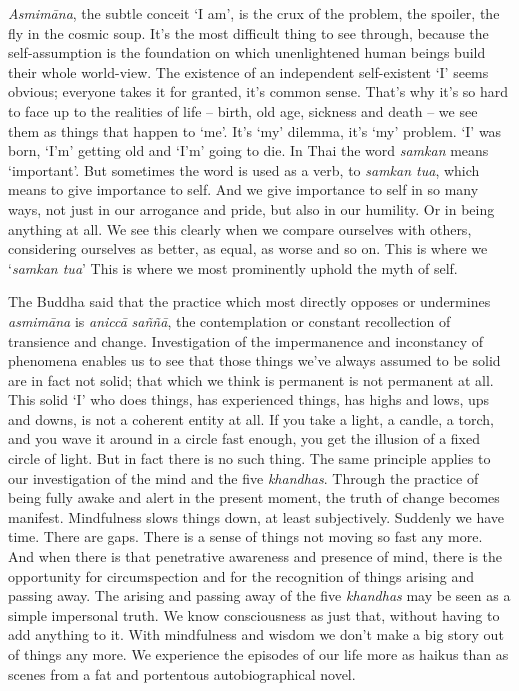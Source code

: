 \emph{Asmimāna}, the subtle conceit `I am', is the crux of the problem, 
the spoiler, the fly in the cosmic soup. It's the most difficult thing
to see through, because the self-assumption is the foundation on which
unenlightened human beings build their whole world-view. The existence
of an independent self-existent `I' seems obvious; everyone takes it for
granted, it's common sense. That's why it's so hard to face up to the
realities of life -- birth, old age, sickness and death -- we see them
as things that happen to `me'. It's `my' dilemma, it's `my' problem. `I'
was born, `I'm' getting old and `I'm' going to die. In Thai the word
\emph{samkan} means `important'. But sometimes the word is used as a
verb, to \emph{samkan tua}, which means to give importance to self. And
we give importance to self in so many ways, not just in our arrogance
and pride, but also in our humility. Or in being anything at all. We see
this clearly when we compare ourselves with others, considering
ourselves as better, as equal, as worse and so on. This is where we
`\emph{samkan tua}' This is where we most prominently uphold the myth of
self. 

The Buddha said that the practice which most directly opposes or
undermines \emph{asmimāna} is \emph{aniccā} \emph{saññā}, the
contemplation or constant recollection of transience and change. 
Investigation of the impermanence and inconstancy of phenomena enables
us to see that those things we've always assumed to be solid are in fact
not solid; that which we think is permanent is not permanent at all. 
This solid `I' who does things, has experienced things, has highs and
lows, ups and downs, is not a coherent entity at all. If you take a
light, a candle, a torch, and you wave it around in a circle fast
enough, you get the illusion of a fixed circle of light. But in fact
there is no such thing. The same principle applies to our investigation
of the mind and the five \emph{khandhas}. Through the practice of being
fully awake and alert in the present moment, the truth of change becomes
manifest. Mindfulness slows things down, at least subjectively. Suddenly
we have time. There are gaps. There is a sense of things not moving so
fast any more. And when there is that penetrative awareness and presence
of mind, there is the opportunity for circumspection and for the
recognition of things arising and passing away. The arising and passing
away of the five \emph{khandhas} may be seen as a simple impersonal
truth. We know consciousness as just that, without having to add
anything to it. With mindfulness and wisdom we don't make a big story
out of things any more. We experience the episodes of our life more as
haikus than as scenes from a fat and portentous autobiographical novel. 

